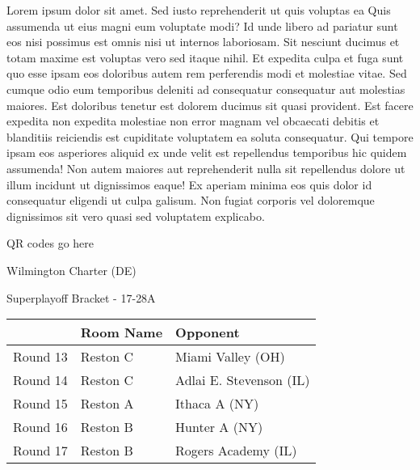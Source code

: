 \documentclass{article}%
\begin{document}
\vspace*{8pt}%
\linebreak%
\newline%
\newline%
Lorem ipsum dolor sit amet. Sed iusto reprehenderit ut quis voluptas ea Quis assumenda ut eius magni eum voluptate modi? Id unde libero ad pariatur sunt eos nisi possimus est omnis nisi ut internos laboriosam. Sit nesciunt ducimus et totam maxime est voluptas vero sed itaque nihil. Et expedita culpa et fuga sunt quo esse ipsam eos doloribus autem rem perferendis modi et molestiae vitae.\newline%
\newline%
Sed cumque odio eum temporibus deleniti ad consequatur consequatur aut molestias maiores. Est doloribus tenetur est dolorem ducimus sit quasi provident. Est facere expedita non expedita molestiae non error magnam vel obcaecati debitis et blanditiis reiciendis est cupiditate voluptatem ea soluta consequatur. Qui tempore ipsam eos asperiores aliquid ex unde velit est repellendus temporibus hic quidem assumenda!\newline%
\newline%
Non autem maiores aut reprehenderit nulla sit repellendus dolore ut illum incidunt ut dignissimos eaque! Ex aperiam minima eos quis dolor id consequatur eligendi ut culpa galisum. Non fugiat corporis vel doloremque dignissimos sit vero quasi sed voluptatem explicabo.\newline%
\newline%
%
\vspace*{30pt}%
\begin{center}%
\begin{Huge}%
QR codes go here%
\end{Huge}%
\end{center}%
\newpage%
\begin{center}%
\begin{Huge}%
Wilmington Charter (DE)%
\end{Huge}%
\vspace*{8pt}%
\linebreak%
\begin{Large}%
Superplayoff Bracket {-} 17{-}28A%
\end{Large}%
\end{center}%
%
\begin{tabularx}{\textwidth}{|c|Y|Y|}%
\hline%
&Room Name&Opponent\\%
\hline%
Round 13&Reston C&Miami Valley (OH)\\%
Round 14&Reston C&Adlai E. Stevenson (IL)\\%
Round 15&Reston A&Ithaca A (NY)\\%
Round 16&Reston B&Hunter A (NY)\\%
Round 17&Reston B&Rogers Academy (IL)\\%
\hline%
\end{tabularx}%
\end{document}
